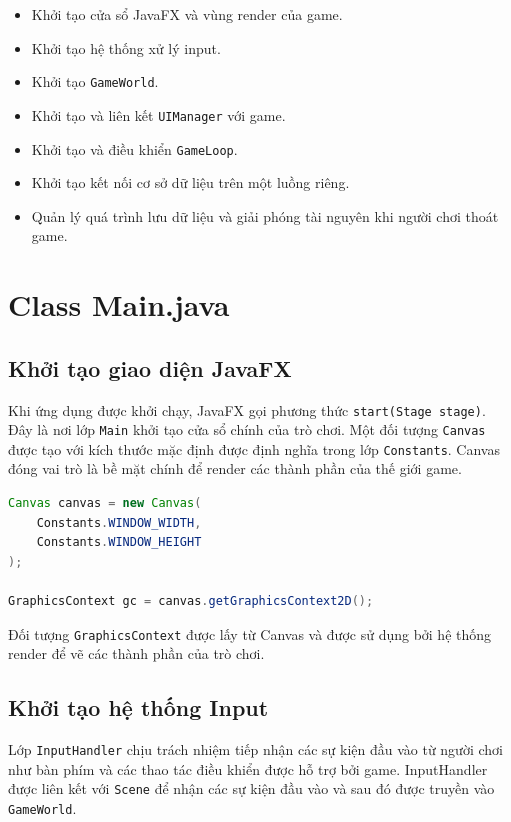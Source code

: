 \documentclass[12pt,a4paper]{report}
\begin{document}
\begin{itemize}
        \begin{itemize}
            \item Khởi tạo cửa sổ JavaFX và vùng render của game.
            \item Khởi tạo hệ thống xử lý input.
            \item Khởi tạo \texttt{GameWorld}.
            \item Khởi tạo và liên kết \texttt{UIManager} với game.
            \item Khởi tạo và điều khiển \texttt{GameLoop}.
            \item Khởi tạo kết nối cơ sở dữ liệu trên một luồng riêng.
            \item Quản lý quá trình lưu dữ liệu và giải phóng tài nguyên
            khi người chơi thoát game.
        \end{itemize}
    \end{itemize}


    \section{Class Main.java}

    \subsection{Khởi tạo giao diện JavaFX}
    Khi ứng dụng được khởi chạy, JavaFX gọi phương thức
    \texttt{start(Stage stage)}. Đây là nơi lớp \texttt{Main}
    khởi tạo cửa sổ chính của trò chơi.
    Một đối tượng \texttt{Canvas} được tạo với kích thước mặc định
    được định nghĩa trong lớp \texttt{Constants}. Canvas đóng vai trò
    là bề mặt chính để render các thành phần của thế giới game.
    \begin{lstlisting}[language=Java]
Canvas canvas = new Canvas(
    Constants.WINDOW_WIDTH,
    Constants.WINDOW_HEIGHT
);

GraphicsContext gc = canvas.getGraphicsContext2D();
    \end{lstlisting}

    Đối tượng \texttt{GraphicsContext} được lấy từ Canvas và được
    sử dụng bởi hệ thống render để vẽ các thành phần của trò chơi.

    \subsection{Khởi tạo hệ thống Input}

    Lớp \texttt{InputHandler} chịu trách nhiệm tiếp nhận các sự kiện
    đầu vào từ người chơi như bàn phím và các thao tác điều khiển
    được hỗ trợ bởi game.
    InputHandler được liên kết với \texttt{Scene} để nhận các sự kiện
    đầu vào và sau đó được truyền vào \texttt{GameWorld}.
\end{document}
